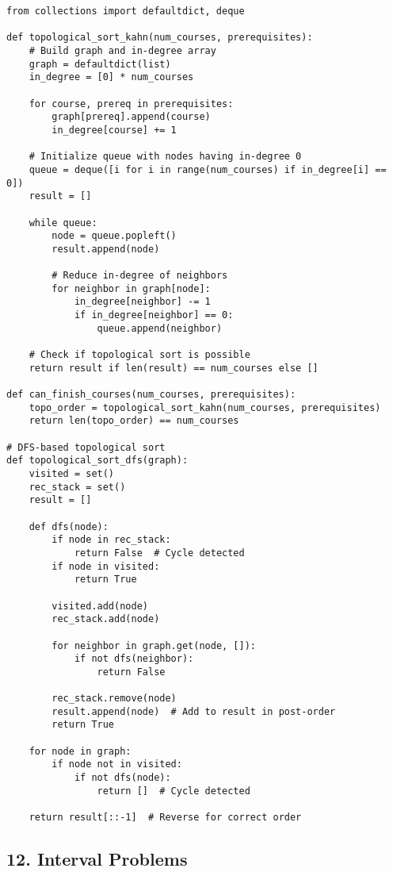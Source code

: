 \documentclass[10pt,a4paper]{article}
\begin{document}
\begin{lstlisting}
from collections import defaultdict, deque

def topological_sort_kahn(num_courses, prerequisites):
    # Build graph and in-degree array
    graph = defaultdict(list)
    in_degree = [0] * num_courses

    for course, prereq in prerequisites:
        graph[prereq].append(course)
        in_degree[course] += 1

    # Initialize queue with nodes having in-degree 0
    queue = deque([i for i in range(num_courses) if in_degree[i] == 0])
    result = []

    while queue:
        node = queue.popleft()
        result.append(node)

        # Reduce in-degree of neighbors
        for neighbor in graph[node]:
            in_degree[neighbor] -= 1
            if in_degree[neighbor] == 0:
                queue.append(neighbor)

    # Check if topological sort is possible
    return result if len(result) == num_courses else []

def can_finish_courses(num_courses, prerequisites):
    topo_order = topological_sort_kahn(num_courses, prerequisites)
    return len(topo_order) == num_courses

# DFS-based topological sort
def topological_sort_dfs(graph):
    visited = set()
    rec_stack = set()
    result = []

    def dfs(node):
        if node in rec_stack:
            return False  # Cycle detected
        if node in visited:
            return True

        visited.add(node)
        rec_stack.add(node)

        for neighbor in graph.get(node, []):
            if not dfs(neighbor):
                return False

        rec_stack.remove(node)
        result.append(node)  # Add to result in post-order
        return True

    for node in graph:
        if node not in visited:
            if not dfs(node):
                return []  # Cycle detected

    return result[::-1]  # Reverse for correct order
\end{lstlisting}

\subsection{12. Interval Problems}
\end{document}
